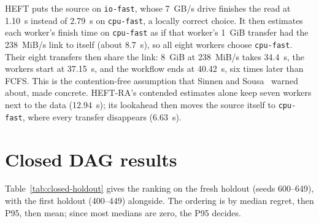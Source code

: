 \documentclass[12pt,a4paper]{report}
\begin{document}
HEFT puts the source on \texttt{io-fast}, whose 7~GB/s drive finishes the
read at 1.10~s instead of 2.79~s on \texttt{cpu-fast}, a locally correct
choice. It then estimates each worker's finish time on \texttt{cpu-fast}
as if that worker's 1~GiB transfer had the 238~MiB/s link to itself (about
8.7~s), so all eight workers choose \texttt{cpu-fast}. Their eight
transfers then share the link: 8~GiB at 238~MiB/s takes 34.4~s, the workers
start at 37.15~s, and the workflow ends at 40.42~s, six times later than
FCFS. This is the contention-free assumption that Sinnen and
Sousa~\cite{sinnen2005contention} warned about, made concrete. HEFT-RA's
contended estimates alone keep seven workers next to the data (12.94~s);
its lookahead then moves the source itself to \texttt{cpu-fast}, where
every transfer disappears (6.63~s).

\section{Closed DAG results}
\label{sec:closed-results}

Table~\ref{tab:closed-holdout} gives the ranking on the fresh holdout
(seeds 600--649), with the first holdout (400--449) alongside. The ordering
is by median regret, then P95, then mean; since most medians are zero, the
P95 decides.
\end{document}
